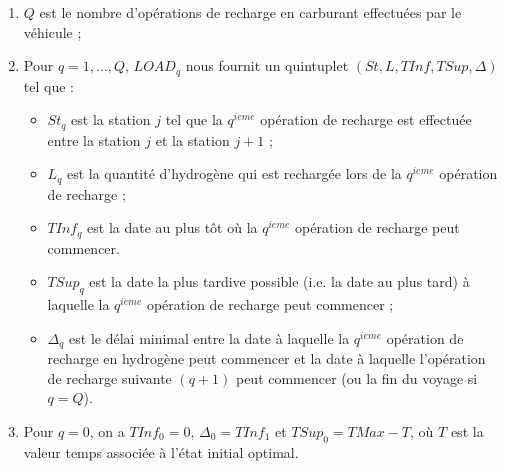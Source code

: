 \begin{enumerate}
	\item $Q$ est le nombre d'opérations de recharge en carburant effectuées par le véhicule ;
	\item Pour $q = 1, \dots,Q$, $LOAD_q$ nous fournit un quintuplet $(St, L, TInf, TSup, \Delta)$ tel que :
	\begin{itemize}[label=$\square$]
		\item $St_q$ est la station $j$ tel que la $q^{ieme}$ opération de recharge est effectuée entre la station $j$ et la station $j+1$ ;
		
		\item $L_q$ est la quantité d'hydrogène qui est rechargée lors de la $q^{ieme}$ opération de recharge ;
		
		\item $ TInf_q$ est la date au plus tôt où la $q^{ieme}$ opération de recharge peut commencer. %
		
		\item $TSup_q$ est la date la plus tardive possible (i.e. la date au plus tard) à laquelle la $q^{ieme}$ opération de recharge peut commencer ;
		
		\item $\Delta_{q}$ est le délai minimal entre la date à laquelle la $q^{ieme}$ opération de recharge en hydrogène peut commencer et la date à laquelle l'opération de recharge suivante $(q+1)$ peut commencer (ou la fin du voyage si $q = Q$). %
	\end{itemize}
\item Pour $q=0$, on a $TInf_0=0$, $\Delta_{0}=TInf_1$ et $TSup_0=TMax-T$, où $T$ est la valeur temps associée à l'état initial optimal. 
\end{enumerate}	

